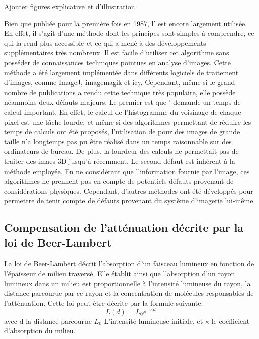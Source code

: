 \documentclass[\main/main.tex]{subfiles}
\begin{document}
\color{magenta}Ajouter figures explicative et d'illustration\color{black}

%
Bien que publiée pour la première fois en 1987\cite{pizer_1987},
l'\clahe{} est encore largement utilisée\cite{dabass_2019,sonali_2018,lv_2019}.
%
En effet, il s'agit d'une méthode dont les principes sont simples à comprendre, ce qui la rend plus accessible et ce qui a mené à des développements supplémentaires très nombreux. Il est facile d'utiliser cet algorithme sans posséder de connaissances techniques pointues en analyse d'images.
%
Cette méthode a été largement implémentée dans différents logiciels de traitement d'images, comme \href{https://imagej.net/Enhance_Local_Contrast_(CLAHE)}{ImageJ},  \href{https://imagemagick.org/script/clahe.php}{imagemagik} et
\href{http://icy.bioimageanalysis.org/plugin/adaptive-histogram-equalization/}{icy}.
%
Cependant, même si le grand nombre  de publications a rendu cette technique très populaire, elle possède néanmoins deux défauts majeurs.
%
Le premier est que '\clahe{} demande un temps de calcul important.
%
En effet, le calcul de l'histogramme du voisinage de chaque pixel est une tâche lourde; et même si des algorithmes permettant de réduire les temps de calculs ont été proposés\cite{sund_2006}, l'utilisation de \clahe{} pour des images de grande taille n'a longtemps pas pu être réalisé dans un temps raisonnable sur des ordinateurs de bureau. De plus, la lourdeur des calculs ne permettait pas de traiter des imaes 3D jusqu'à récemment\cite{amorim_2018, stimper_2019}.
%
Le second défaut est inhérent à la méthode employée. En ne considérant que l'information fournie par l'image, ces algorithmes ne prennent pas en compte de potentiels défauts provenant de considérations physiques.
%
Cependant, d'autres méthodes ont été développés pour permettre de tenir compte de défauts provenant du système d'imagerie lui-même.

\subsection{Compensation de l'atténuation décrite par la loi de Beer-Lambert} %

%
La loi de Beer-Lambert décrit l'absorption d'un faisceau lumineux en fonction de l'épaisseur de milieu traversé. Elle établit ainsi que l'absorption d'un rayon lumineux dans un milieu est proportionnelle à l'intensité lumineuse du rayon, la distance parcourue par ce rayon et la concentration de molécules responsables de l'atténuation.
%
Cette loi peut être décrite par la formule suivante:
\begin{equation}
    L(d) = L_{0}e^{-\kappa{}d}
\end{equation}
avec d la distance parcourue $L_{0}$ L'intensité lumineuse initiale, et $\kappa{}$ le coefficient d'absorption du milieu.
\end{document}
